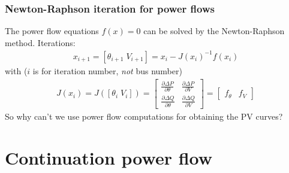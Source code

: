 \documentclass{beamer}
\begin{document}
\begin{frame}[label=nr-power-flow]
  \frametitle{Newton-Raphson iteration for power flows}
The power flow equations $f(x)=0$ can be solved by the Newton-Raphson method. Iterations:
  \begin{align}
      x_{i+1} = [\theta_{i+1} \; V_{i+1}] = x_i - J(x_i)^{-1} f(x_i)
  \end{align}
with ($i$ is for iteration number, \emph{not} bus number)
\begin{align}
  J(x_i) = J([\theta_i \; V_i]) = \begin{bmatrix}
     \frac{\partial \Delta P}{\partial \theta} & \frac{\partial \Delta P}{\partial V} \\
     \frac{\partial \Delta Q}{\partial \theta} & \frac{\partial \Delta Q}{\partial V}
   \end{bmatrix} = \begin{bmatrix}
   f_{\theta} & f_V
   \end{bmatrix}
\end{align}
So why can't we use power flow computations for obtaining the PV curves?\\
\end{frame}

\section[CPF]{Continuation power flow}
\label{sec:cont-power-flow}
\end{document}
